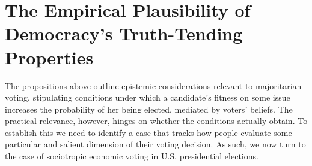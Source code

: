 \documentclass[11pt]{article}
\begin{document}
\section{The Empirical Plausibility of Democracy's Truth-Tending Properties}%
The propositions above outline epistemic considerations relevant to majoritarian voting, stipulating conditions under which a candidate's fitness on some issue increases the probability of her being elected, mediated by voters' beliefs.
The practical relevance, however, hinges on whether the conditions actually obtain. To establish this we need to identify a case that tracks how people evaluate some particular and salient dimension of their voting decision. %
As such, we now turn to the case of sociotropic economic voting in U.S. presidential elections.
\end{document}
